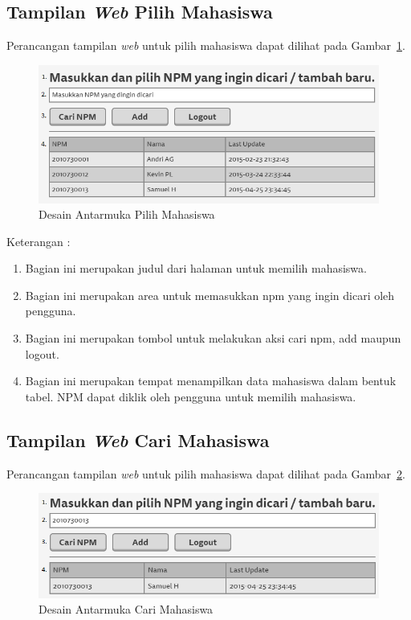 \subsection{Tampilan {\it Web} Pilih Mahasiswa}
Perancangan tampilan {\it web} untuk pilih mahasiswa dapat dilihat pada
Gambar~\ref{fig:pilihmahasiswa}.

\begin{figure}[ht]
\centering
\includegraphics[scale=0.8]{Gambar/pilihmahasiswa.png}
\caption[Desain Antarmuka Pilih Mahasiswa]{Desain Antarmuka Pilih Mahasiswa}
\label{fig:pilihmahasiswa}
\end{figure}

Keterangan :
\begin{enumerate}[(1)]
\item
Bagian ini merupakan judul dari halaman untuk memilih mahasiswa.
\item
Bagian ini merupakan area untuk memasukkan npm yang ingin dicari oleh pengguna.
\item
Bagian ini merupakan tombol untuk melakukan aksi cari npm, add maupun logout.
\item
Bagian ini merupakan tempat menampilkan data mahasiswa dalam bentuk tabel. NPM dapat diklik oleh pengguna untuk memilih mahasiswa.
\end{enumerate}

\subsection{Tampilan {\it Web} Cari Mahasiswa}
Perancangan tampilan {\it web} untuk pilih mahasiswa dapat dilihat pada
Gambar~\ref{fig:carimahasiswa}.

\begin{figure}[ht]
\centering
\includegraphics[scale=0.8]{Gambar/carimahasiswa.png}
\caption[Desain Antarmuka Cari Mahasiswa]{Desain Antarmuka Cari Mahasiswa}
\label{fig:carimahasiswa}
\end{figure}

